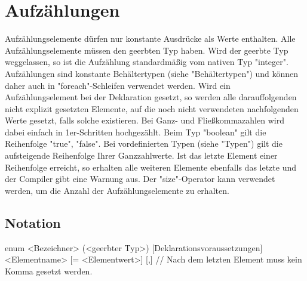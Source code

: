 \chapter{Aufzählungen}
Aufzählungselemente dürfen nur konstante Ausdrücke als Werte enthalten.
Alle Aufzählungselemente müssen den geerbten Typ haben.
Wird der geerbte Typ weggelassen, so ist die Aufzählung standardmäßig vom nativen Typ "integer".
Aufzählungen sind konstante Behältertypen (siehe "Behältertypen") und können daher auch in "foreach"-Schleifen verwendet werden.
Wird ein Aufzählungselement bei der Deklaration gesetzt, so werden alle darauffolgenden nicht explizit gesetzten Elemente,
auf die noch nicht verwendeten nachfolgenden Werte gesetzt, falls solche existieren.
Bei Ganz- und Fließkommazahlen wird dabei einfach in 1er-Schritten hochgezählt.
Beim Typ "boolean" gilt die Reihenfolge "true", "false". Bei vordefinierten Typen (siehe "Typen") gilt die aufsteigende
Reihenfolge Ihrer Ganzzahlwerte.
Ist das letzte Element einer Reihenfolge erreicht, so erhalten alle weiteren Elemente ebenfalls das letzte
und der Compiler gibt eine Warnung aus.
Der "size"-Operator kann verwendet werden, um die Anzahl der Aufzählungselemente zu erhalten.

\section{Notation}
enum <Bezeichner> (<geerbter Typ>) [Deklarationsvoraussetzungen]
    <Elementname> [= <Elementwert>] [,] // Nach dem letzten Element muss kein Komma gesetzt werden.